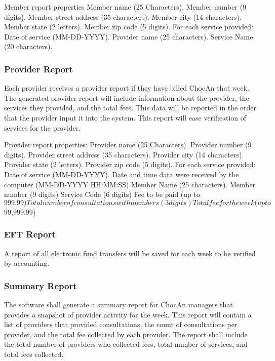 \documentclass{article}
\begin{document}
Member report properties
Member name (25 Characters).
Member number (9 digits).
Member street address (35  characters).
Member city (14 characters).
Member state (2 letters).
Member zip code (5 digits).
For each service provided:
Date of service (MM-DD-YYYY).
Provider name (25 characters).
Service Name (20 characters).

\subsubsection{Provider Report}
Each provider receives a provider report if they have billed ChocAn that week. The generated provider report will include information about the provider, the services they provided, and the total fees. This data will be reported in the order that the provider input it into the system. This report will ease verification of services for the provider. 

Provider report properties:
Provider name (25 Characters).
Provider number (9 digits).
Provider street address (35  characters).
Provider city (14 characters).
Provider state (2 letters).
Provider zip code (5 digits).
For each service provided:
Date of service (MM-DD-YYYY).
Date and time data were received by the computer (MM-DD-YYYY HH:MM:SS)
Member Name (25 characters).
Member number (9 digits)
Service Code (6 digits)
Fee to be paid (up to $999.99)
Total number of consultations with members (3 digits)
Total fee for the week (up to $99,999.99)

\subsubsection{EFT Report}
A report of all electronic fund transfers will be saved for each week to be verified by accounting.

\subsubsection{Summary Report}
The software shall generate a summary report for ChocAn managers that provides a snapshot of provider activity for the week. This report will contain a list of providers that provided consultations, the count of consultations per provider, and the total fee collected by each provider. The report shall include the total number of providers who collected fees, total number of services, and total fees collected.
\end{document}
